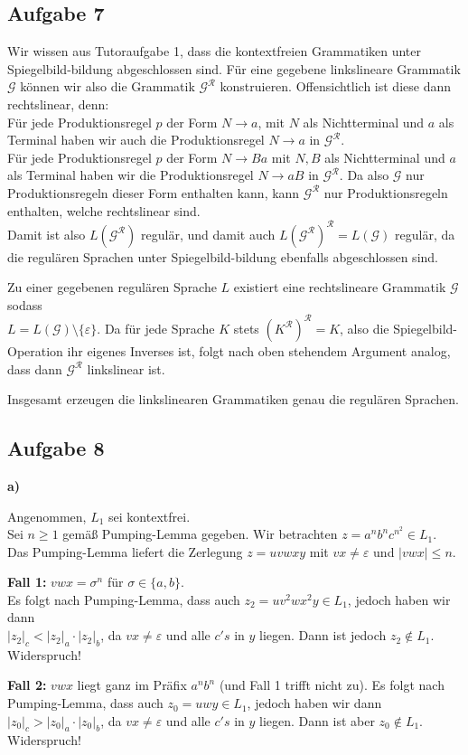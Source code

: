 \documentclass[a4paper,graphics,11pt]{article}
\newcommand{\aufgabe}[1]{\subsection*{Aufgabe #1}}
\begin{document}
\aufgabe{7}
Wir wissen aus Tutoraufgabe 1, dass die kontextfreien Grammatiken unter
Spiegelbild-bildung abgeschlossen sind.
Für eine gegebene linkslineare Grammatik $\mathcal{G}$ können wir also die
Grammatik $\mathcal{G}^{\mathcal{R}}$ konstruieren. Offensichtlich ist diese
dann rechtslinear, denn:\\
Für jede Produktionsregel $p$ der Form $N \to a$, mit $N$ als Nichtterminal und
$a$ als Terminal haben wir auch die Produktionsregel
$N \to a$ in $\mathcal{G}^{\mathcal{R}}$.\\
Für jede Produktionsregel $p$ der Form $N \to Ba$ mit $N,B$ als Nichtterminal und
$a$ als Terminal haben wir die Produktionsregel
$N \to aB$ in $\mathcal{G}^{\mathcal{R}}$. Da also $\mathcal{G}$ nur Produktionsregeln
dieser Form enthalten kann, kann $\mathcal{G}^\mathcal{R}$ nur Produktionsregeln
enthalten, welche rechtslinear sind.\\
Damit ist also $L(\mathcal{G}^\mathcal{R})$ regulär, und damit auch
$L(\mathcal{G}^\mathcal{R})^\mathcal{R} = L(\mathcal{G})$ regulär, da
die regulären Sprachen unter Spiegelbild-bildung ebenfalls abgeschlossen sind.

Zu einer gegebenen regulären Sprache $L$ existiert eine rechtslineare Grammatik $\mathcal{G}$ sodass \\
$L = L(\mathcal{G}) \setminus \{\varepsilon\}$. Da für jede Sprache $K$ stets
$(K^\mathcal{R})^\mathcal{R} = K$, also die Spiegelbild-Operation ihr eigenes Inverses
ist, folgt nach oben stehendem Argument analog, dass dann $\mathcal{G}^\mathcal{R}$
linkslinear ist.

Insgesamt erzeugen die linkslinearen Grammatiken genau die regulären Sprachen.

\newpage
\aufgabe{8}
\textbf{a)}

Angenommen, $L_1$ sei kontextfrei.\\
Sei $n \geq 1$ gemäß Pumping-Lemma gegeben.
Wir betrachten $z = a^nb^nc^{n^2} \in L_1$.\\
Das Pumping-Lemma liefert die
Zerlegung $z = uvwxy$ mit $vx \neq \varepsilon$ und $|vwx| \leq n$.

\textbf{Fall 1:} $vwx = \sigma^n$ für $\sigma \in \{a,b\}$.\\
Es folgt nach Pumping-Lemma, dass auch $z_2 = uv^2wx^2y \in L_1$, jedoch haben wir dann\\
$|z_2|_c < |z_2|_a \cdot |z_2|_b$, da $vx \neq \varepsilon$ und alle $c's$ in $y$ liegen. Dann ist jedoch $z_2 \notin L_1$. Widerspruch!

\textbf{Fall 2:} $vwx$ liegt ganz im Präfix $a^nb^n$ (und Fall 1 trifft nicht zu).
Es folgt nach Pumping-Lemma, dass auch $z_0 = uwy \in L_1$, jedoch haben wir dann
$|z_0|_c > |z_0|_a \cdot |z_0|_b$, da $vx \neq \varepsilon$ und alle $c's$ in $y$ liegen. Dann ist aber $z_0 \notin L_1$. Widerspruch!
\end{document}
